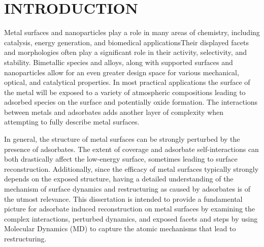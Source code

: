 %

\chapter{INTRODUCTION}
Metal \citep{} surfaces and nanoparticles play a role in many areas of chemistry,
including catalysis, energy generation, and biomedical applicationsTheir
displayed facets and morphologies often play a significant role in their
activity, selectivity, and stability. Bimetallic species and alloys, along with
supported surfaces and nanoparticles allow for an even greater design space for
various mechanical, optical, and catalytical properties. In most practical
applications the surface of the metal will be exposed to a variety of
atmospheric compositions leading to adsorbed species on the surface and
potentially oxide formation. The interactions between metals and adsorbates
adds another layer of complexity when attempting to fully describe metal
surfaces.

In general, the structure of metal surfaces can be strongly perturbed by the
presence of adsorbates. The extent of coverage and adsorbate self-interactions
can both drastically affect the low-energy surface, sometimes leading to
surface reconstruction. Additionally, since the efficacy of metal surfaces
typically strongly depends on the exposed structure, having a detailed
understanding of the mechanism of surface dynamics and restructuring as caused
by adsorbates is of the utmost relevance. This dissertation is intended to
provide a fundamental picture for adsorbate induced reconstruction on metal
surfaces by examining the complex interactions, perturbed dynamics, and exposed
facets and steps by using Molecular Dynamics (MD) to capture the atomic
mechanisms that lead to restructuring.



